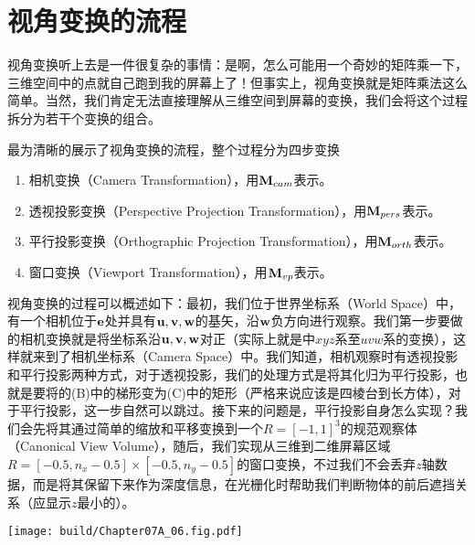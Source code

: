 \section{视角变换的流程}

视角变换听上去是一件很复杂的事情：是啊，怎么可能用一个奇妙的矩阵乘一下，三维空间中的点就自己跑到我的屏幕上了！但事实上，视角变换就是矩阵乘法这么简单。当然，我们肯定无法直接理解从三维空间到屏幕的变换，我们会将这个过程拆分为若干个变换的组合。

最为清晰的展示了视角变换的流程，整个过程分为四步变换
\begin{enumerate}
    \item 相机变换（Camera Transformation），用$\vb{M}_{cam}$表示。
    \item 透视投影变换（Perspective Projection Transformation），用$\vb{M}_{pers}$表示。
    \item 平行投影变换（Orthographic Projection Transformation），用$\vb{M}_{orth}$表示。
    \item 窗口变换（Viewport Transformation），用$\vb{M}_{vp}$表示。
\end{enumerate}
视角变换的过程可以概述如下：最初，我们位于世界坐标系（World Space）中，有一个相机位于$\vb{e}$处并具有$\vb{u},\vb{v},\vb{w}$的基矢，沿$\vb{w}$负方向进行观察。我们第一步要做的相机变换就是将坐标系沿$\vb{u},\vb{v},\vb{w}$对正（实际上就是中$xyz$系至$uvw$系的变换），这样就来到了相机坐标系（Camera Space）中。我们知道，相机观察时有透视投影和平行投影两种方式，对于透视投影，我们的处理方式是将其化归为平行投影，也就是要将的(B)中的梯形变为(C)中的矩形（严格来说应该是四棱台到长方体），对于平行投影，这一步自然可以跳过。接下来的问题是，平行投影自身怎么实现？我们会先将其通过简单的缩放和平移变换到一个$R=[-1,1]^3$的规范观察体（Canonical View Volume），随后，我们实现从三维到二维屏幕区域$R=[-0.5,n_x-0.5]\times[-0.5,n_y-0.5]$的窗口变换，不过我们不会丢弃$z$轴数据，而是将其保留下来作为深度信息，在光栅化时帮助我们判断物体的前后遮挡关系（应显示$z$最小的）。

\begin{Figure}[视角变换流程]
    \texttt{[image: build/Chapter07A\_06.fig.pdf]}
\end{Figure}